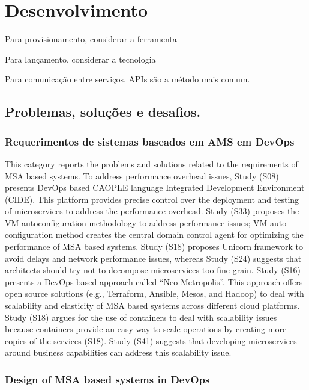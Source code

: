 \chapter{Desenvolvimento}

Para provisionamento, considerar a ferramenta ~~

Para lançamento, considerar a tecnologia ~~

Para comunicação entre serviços, APIs são a método mais comum.

\section{Problemas, soluções e desafios.}

\subsection*{Requerimentos de sistemas baseados em AMS em DevOps}

This category reports the problems and solutions related to the requirements of MSA based systems. To address performance overhead issues, Study (S08) presents DevOps based CAOPLE language Integrated Development Environment (CIDE). This platform provides precise control over the deployment and testing of microservices to address the performance overhead. Study (S33) proposes the VM autoconfiguration methodology to address performance issues; VM auto-configuration method creates the central domain control agent for optimizing the performance of MSA based systems. Study (S18) proposes Unicorn framework to avoid delays and network performance issues, whereas Study (S24) suggests that architects should try not to decompose microservices too fine-grain. Study (S16) presents a DevOps based approach called “Neo-Metropolis”. This approach offers open source solutions (e.g., Terraform, Ansible, Mesos, and Hadoop) to deal with scalability and elasticity of MSA based systems across different cloud platforms. Study (S18) argues for the use of containers to deal with scalability issues because containers provide an easy way to scale operations by creating more copies of the services (S18). Study (S41) suggests that developing microservices around business capabilities can address this scalability issue.

\subsection{Design of MSA based systems in DevOps}

